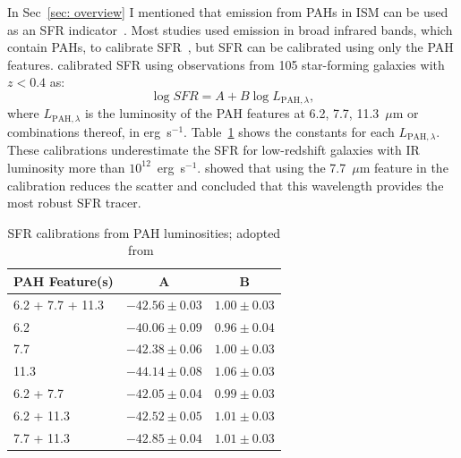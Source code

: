 In Sec~\ref{sec: overview} I mentioned that emission from PAHs in ISM can be used as an SFR indicator~\citep[e.g.][]{Peeters04}.
Most studies used emission in broad infrared bands, which contain PAHs, to calibrate SFR~\citep[e.g.][]{Calzetti07}, but SFR can be calibrated using only the PAH features.
\cite{Shipley16} calibrated SFR using observations from 105 star-forming galaxies with $z < 0.4$ as:
\begin{equation}
\log SFR = A + B \log L_{\mathrm{PAH}, \lambda},
\end{equation}
where $L_{\mathrm{PAH}, \lambda}$ is the luminosity of the PAH features at 6.2, 7.7, 11.3~$\mu$m or combinations thereof, in erg~s$^{-1}$.
Table~\ref{table_PAH} shows the constants for each $L_{\mathrm{PAH}, \lambda}$.
These calibrations underestimate the SFR for low-redshift galaxies with IR luminosity more than $10^{12}$~erg~s$^{-1}$.
\cite{Shipley16} showed that using the 7.7~$\mu$m feature in the calibration reduces the scatter and concluded that this wavelength provides the most robust SFR tracer.

\begin{center}
\begin{table}
\caption{SFR calibrations from PAH luminosities; adopted from~\cite{Shipley16}}
\label{table_PAH}
\begin{tabular}{ l c c}
\hline\hline
PAH Feature(s) & A & B\\
\hline
6.2 + 7.7 + 11.3 & $ -42.56 \pm 0.03 $ &  $1.00 \pm 0.03$ \\ 
6.2 & $ -40.06 \pm 0.09 $ &  $0.96 \pm 0.04$ \\ 
7.7 & $ -42.38 \pm 0.06 $ &  $1.00 \pm 0.03$ \\ 
11.3 & $ -44.14 \pm 0.08 $ &  $1.06 \pm 0.03$ \\ 
6.2 + 7.7 & $ -42.05 \pm 0.04 $ &  $0.99 \pm 0.03$ \\ 
6.2 + 11.3 & $ -42.52 \pm 0.05 $ &  $1.01 \pm 0.03$ \\ 
7.7 + 11.3 & $ -42.85 \pm 0.04 $ &  $1.01 \pm 0.03$ \\ 
\hline
\end{tabular}
\end{table}  
\end{center}

